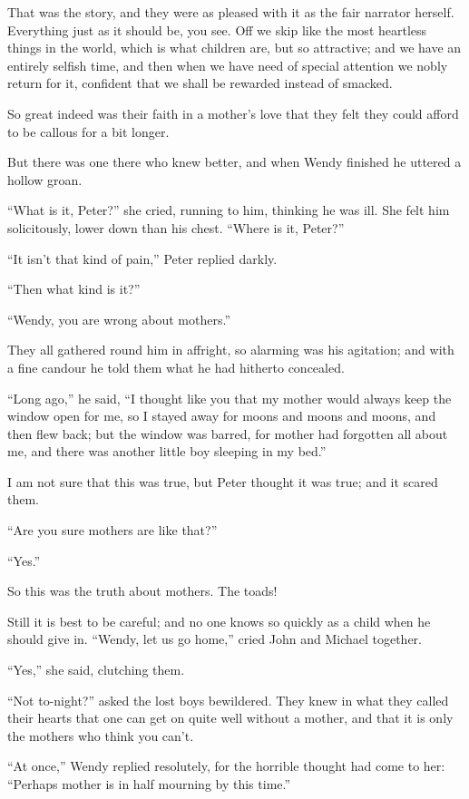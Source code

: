 That was the story, and they were as pleased with it as the fair
narrator herself. Everything just as it should be, you see. Off we skip
like the most heartless things in the world, which is what children
are, but so attractive; and we have an entirely selfish time, and then
when we have need of special attention we nobly return for it,
confident that we shall be rewarded instead of smacked.

So great indeed was their faith in a mother's love that they felt they
could afford to be callous for a bit longer.

But there was one there who knew better, and when Wendy finished he
uttered a hollow groan.

``What is it, Peter?'' she cried, running to him, thinking he was ill.
She felt him solicitously, lower down than his chest. ``Where is it,
Peter?''

``It isn't that kind of pain,'' Peter replied darkly.

``Then what kind is it?''

``Wendy, you are wrong about mothers.''

They all gathered round him in affright, so alarming was his agitation;
and with a fine candour he told them what he had hitherto concealed.

``Long ago,'' he said, ``I thought like you that my mother would always
keep the window open for me, so I stayed away for moons and moons and
moons, and then flew back; but the window was barred, for mother had
forgotten all about me, and there was another little boy sleeping in my
bed.''

I am not sure that this was true, but Peter thought it was true; and it
scared them.

``Are you sure mothers are like that?''

``Yes.''

So this was the truth about mothers. The toads!

Still it is best to be careful; and no one knows so quickly as a child
when he should give in. ``Wendy, let us go home,'' cried John and Michael
together.

``Yes,'' she said, clutching them.

``Not to-night?'' asked the lost boys bewildered. They knew in what they
called their hearts that one can get on quite well without a mother,
and that it is only the mothers who think you can't.

``At once,'' Wendy replied resolutely, for the horrible thought had come
to her: ``Perhaps mother is in half mourning by this time.''

